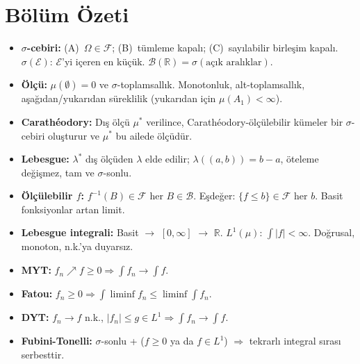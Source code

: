 \section*{Bölüm Özeti}

\begin{bolumozeti}
\begin{itemize}
  \item \textbf{$\sigma$-cebiri:} (A)~$\Omega \in \mathcal{F}$;
        (B)~tümleme kapalı; (C)~sayılabilir birleşim kapalı.
        $\sigma(\mathcal{E})$: $\mathcal{E}$'yi içeren en küçük.
        $\mathcal{B}(\mathbb{R}) = \sigma(\text{açık aralıklar})$.
  \item \textbf{Ölçü:} $\mu(\emptyset)=0$ ve $\sigma$-toplamsallık.
        Monotonluk, alt-toplamsallık, aşağıdan/yukarıdan süreklilik
        (yukarıdan için $\mu(A_1)<\infty$).
  \item \textbf{Carathéodory:} Dış ölçü $\mu^*$ verilince, Carathéodory-ölçülebilir
        kümeler bir $\sigma$-cebiri oluşturur ve $\mu^*$ bu ailede ölçüdür.
  \item \textbf{Lebesgue:} $\lambda^*$ dış ölçüden $\lambda$ elde edilir;
        $\lambda((a,b))=b-a$, öteleme değişmez, tam ve $\sigma$-sonlu.
  \item \textbf{Ölçülebilir $f$:} $f^{-1}(B) \in \mathcal{F}$ her $B \in \mathcal{B}$.
        Eşdeğer: $\{f \leq b\} \in \mathcal{F}$ her $b$.
        Basit fonksiyonlar artan limit.
  \item \textbf{Lebesgue integrali:} Basit $\to$ $[0,\infty]$ $\to$ $\mathbb{R}$.
        $L^1(\mu)$: $\int|f|<\infty$. Doğrusal, monoton, n.k.'ya duyarsız.
  \item \textbf{MYT:} $f_n \nearrow f \geq 0 \Rightarrow \int f_n \to \int f$.
  \item \textbf{Fatou:} $f_n \geq 0 \Rightarrow \int\liminf f_n \leq \liminf\int f_n$.
  \item \textbf{DYT:} $f_n \to f$ n.k., $|f_n| \leq g \in L^1 \Rightarrow \int f_n \to \int f$.
  \item \textbf{Fubini-Tonelli:} $\sigma$-sonlu + ($f\geq 0$ ya da $f\in L^1$)
        $\Rightarrow$ tekrarlı integral sırası serbesttir.
\end{itemize}
\end{bolumozeti}

